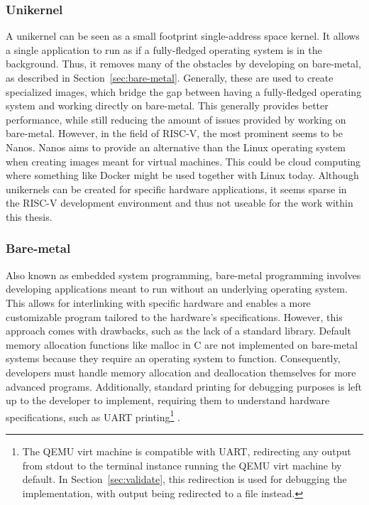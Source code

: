 \subsubsection*{Unikernel}
A unikernel can be seen as a small footprint single-address space kernel. It
allows a single application to run as if a fully-fledged operating system is in
the background. Thus, it removes many of the obstacles by developing on
bare-metal, as described in Section~\ref{sec:bare-metal}. Generally, these are
used to create specialized images, which bridge the gap between having a
fully-fledged operating system and working directly on bare-metal. This
generally provides better performance, while still reducing the amount of issues
provided by working on bare-metal. However, in the field of RISC-V, the most
prominent seems to be Nanos. Nanos aims to provide an alternative than the Linux
operating system when creating images meant for virtual machines. This could be
cloud computing where something like Docker might be used together with Linux
today. Although unikernels can be created for specific hardware applications, it
seems sparse in the RISC-V development environment and thus not useable for the
work within this thesis.

\subsubsection*{Bare-metal}
Also known as embedded system programming, bare-metal programming involves
developing applications meant to run without an underlying operating system.
This allows for interlinking with specific hardware and enables a more
customizable program tailored to the hardware's specifications. However, this
approach comes with drawbacks, such as the lack of a standard library. Default
memory allocation functions like malloc in C are not implemented on bare-metal
systems because they require an operating system to function. Consequently,
developers must handle memory allocation and deallocation themselves for more
advanced programs. Additionally, standard printing for debugging purposes is
left up to the developer to implement, requiring them to understand hardware
specifications, such as UART printing\footnote{The QEMU virt machine is
  compatible with UART, redirecting any output from stdout to the terminal
instance running the QEMU virt machine by default. In
Section~\ref{sec:validate}, this redirection is used for debugging the
implementation, with output being redirected to a file instead.}
\cite{uart}.

